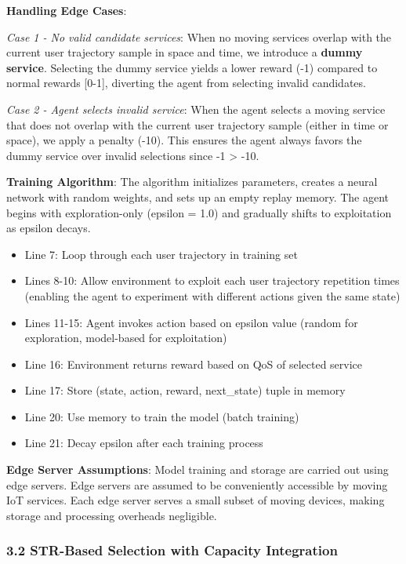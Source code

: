 \textbf{Handling Edge Cases}:

\emph{Case 1 - No valid candidate services}: When no moving services
overlap with the current user trajectory sample in space and time, we
introduce a \textbf{dummy service}. Selecting the dummy service yields a
lower reward (-1) compared to normal rewards {[}0-1{]}, diverting the
agent from selecting invalid candidates.

\emph{Case 2 - Agent selects invalid service}: When the agent selects a
moving service that does not overlap with the current user trajectory
sample (either in time or space), we apply a penalty (-10). This ensures
the agent always favors the dummy service over invalid selections since
-1 \textgreater{} -10.

\textbf{Training Algorithm}: The algorithm initializes parameters,
creates a neural network with random weights, and sets up an empty
replay memory. The agent begins with exploration-only (epsilon = 1.0) and
gradually shifts to exploitation as epsilon decays.

\begin{itemize}
	\tightlist
	\item
	      Line 7: Loop through each user trajectory in training set
	\item
	      Lines 8-10: Allow environment to exploit each user trajectory
	      repetition times (enabling the agent to experiment with different
	      actions given the same state)
	\item
	      Lines 11-15: Agent invokes action based on epsilon value (random for
	      exploration, model-based for exploitation)
	\item
	      Line 16: Environment returns reward based on QoS of selected service
	\item
	      Line 17: Store (state, action, reward, next\_state) tuple in memory
	\item
	      Line 20: Use memory to train the model (batch training)
	\item
	      Line 21: Decay epsilon after each training process
\end{itemize}

\textbf{Edge Server Assumptions}: Model training and storage are carried
out using edge servers. Edge servers are assumed to be conveniently
accessible by moving IoT services. Each edge server serves a small
subset of moving devices, making storage and processing overheads
negligible.

\hypertarget{str-based-selection-with-capacity-integration}{%
	\subsubsection{3.2 STR-Based Selection with Capacity
		Integration}\label{str-based-selection-with-capacity-integration}}

